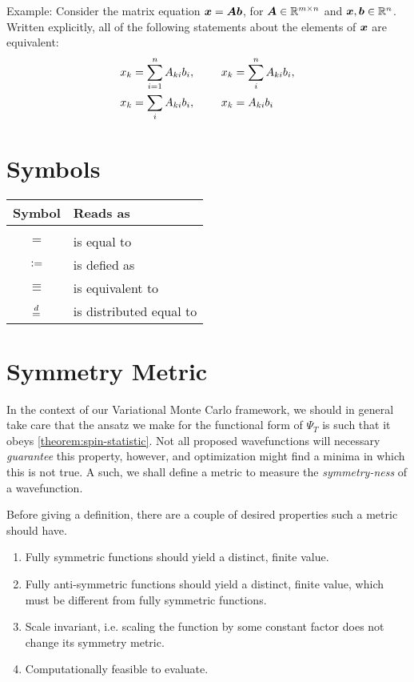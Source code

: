 \documentclass[Thesis.tex]{subfiles}
\begin{document}
Example: Consider the matrix equation $\bm{x} = \bm{A}\bm{b}$, for
$\bm{A}\in\mathbb{R}^{m\times n}$ and $\bm{x}, \bm{b} \in \mathbb{R}^n$. Written
explicitly, all of the following statements about the elements of $\bm{x}$ are equivalent:
\begin{align}
  \begin{split}
  x_k &= \sum_{i=1}^n A_{ki}b_i,\qq{ } x_k = \sum_{i}^n A_{ki}b_i,\\
  x_k &= \sum_{i} A_{ki}b_i,\qq{ } x_k = A_{ki}b_i
  \end{split}
\end{align}
\section{Symbols}
\begin{center}
\begin{tabular}{cl}
  Symbol & Reads as\\
  \hline\\
  $=$ & is equal to\\
  $\vcentcolon=$ & is defied as\\
  $\equiv$ & is equivalent to\\
  $\overset{d}{=}$ & is distributed equal to
\end{tabular}
\end{center}

\section{Symmetry Metric}

In the context of our Variational Monte Carlo framework, we should in general
take care that the ansatz we make for the functional form of $\Psi_T$ is such
that it obeys \autoref{theorem:spin-statistic}. Not all proposed wavefunctions
will necessary \emph{guarantee} this property, however, and optimization might
find a minima in which this is not true. A such, we shall define a metric to
measure the \emph{symmetry-ness} of a wavefunction.

Before giving a definition, there are a couple of desired properties such a
metric should have.

\begin{enumerate}
    \item Fully symmetric functions should yield a distinct, finite value.
    \item Fully anti-symmetric functions should yield a distinct, finite value,
        which must be different from fully symmetric functions.
    \item Scale invariant, i.e. scaling the function by
        some constant factor does not change its symmetry metric.
    \item Computationally feasible to evaluate.
\end{enumerate}
\end{document}
